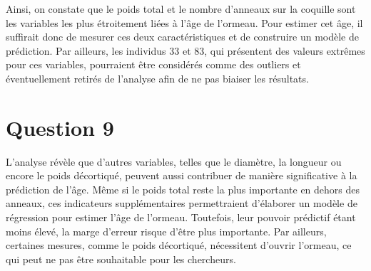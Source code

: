 \documentclass[
]{article}
\begin{document}
Ainsi, on constate que le poids total et le nombre d'anneaux sur la
coquille sont les variables les plus étroitement liées à l'âge de
l'ormeau. Pour estimer cet âge, il suffirait donc de mesurer ces deux
caractéristiques et de construire un modèle de prédiction. Par ailleurs,
les individus 33 et 83, qui présentent des valeurs extrêmes pour ces
variables, pourraient être considérés comme des outliers et
éventuellement retirés de l'analyse afin de ne pas biaiser les
résultats.

\section{Question 9}\label{question-9}

L'analyse révèle que d'autres variables, telles que le diamètre, la
longueur ou encore le poids décortiqué, peuvent aussi contribuer de
manière significative à la prédiction de l'âge. Même si le poids total
reste la plus importante en dehors des anneaux, ces indicateurs
supplémentaires permettraient d'élaborer un modèle de régression pour
estimer l'âge de l'ormeau. Toutefois, leur pouvoir prédictif étant moins
élevé, la marge d'erreur risque d'être plus importante. Par ailleurs,
certaines mesures, comme le poids décortiqué, nécessitent d'ouvrir
l'ormeau, ce qui peut ne pas être souhaitable pour les chercheurs.
\end{document}
